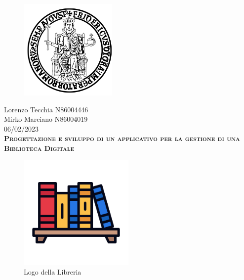 \documentclass[table]{report}
\begin{document}
\begin{center}

\end{center}
    \begin{figure}[htbp!]
        \begin{center}
            \includegraphics[width=.25\textwidth]{Immagini/FedericoII.png}
        \end{center}
    \end{figure}
    
    {\scshape\Large\bfseries {}
    \begin{center}
        Lorenzo Tecchia N86004446 \\ Mirko Marciano N86004019 \\ 06/02/2023 \\
        
        
        
        
        \scshape\Large\bfseries Progettazione e sviluppo di un applicativo per la gestione di una Biblioteca Digitale
        
        \begin{figure}[hbt]
        \centering
  \includegraphics[width=0.5\textwidth]{Immagini/startpage.png}
  \caption{Logo della Libreria
  }
\end{figure}

        
    \end{center}}


    \newpage
    
    \tableofcontents
    \listoffigures
    \listoftables
    
    
    
    
    

    
\end{document}
